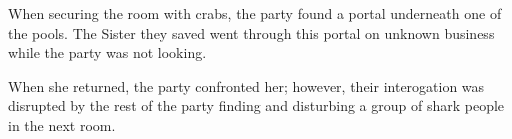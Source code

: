 When securing the room with crabs, the party found a portal underneath one of the pools.
The Sister they saved went through this portal on unknown business while the party was not looking.

When she returned, the party confronted her; however, their interogation was disrupted by the rest of the party finding and disturbing a group of shark people in the next room.